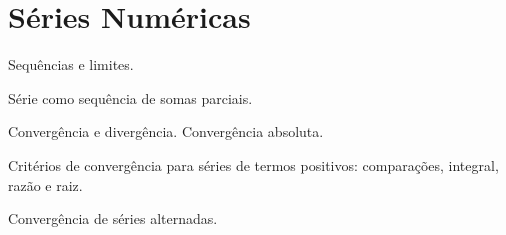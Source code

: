 \chapter{Séries Numéricas}

Sequências e limites.

Série como sequência de somas parciais.

Convergência e divergência. Convergência absoluta.

Critérios de convergência para séries de termos positivos: comparações, integral, razão e raiz.

Convergência de séries alternadas.

